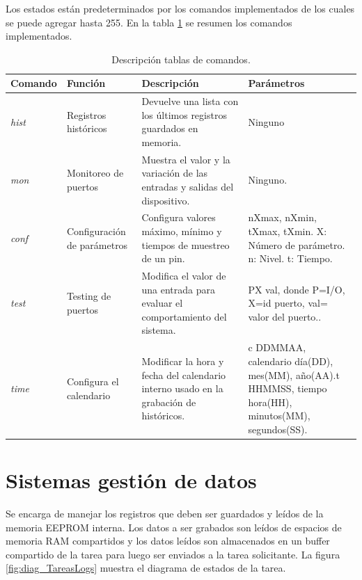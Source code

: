 Los estados están predeterminados por los comandos implementados de los cuales se puede agregar hasta 255. En la tabla \ref{tablas_comandos} se resumen los comandos implementados.

\begin{table}[]
\hspace{-1.5cm}
\begin{flushleft}
\begin{tabular}{|m{1.8cm}|m{3cm}|m{4.5cm}|m{4.5cm}|}\hline
{\textbf{Comando}} & {\textbf{Función}} & {\textbf{Descripción}} & {\textbf{Parámetros}} \\ \hline
{\textit{hist}} & {Registros históricos} & { Devuelve una lista con los últimos registros guardados en memoria.} & {Ninguno} \\ \hline
{\textit{mon}} & {Monitoreo de puertos} & {Muestra el valor y la variación de las entradas y salidas del dispositivo.} & {Ninguno.} \\ \hline
{\textit{conf}} & {Configuración de parámetros} & {Configura valores máximo, mínimo y tiempos de muestreo de un pin.} & {nXmax, nXmin, tXmax, tXmin. X: Número de parámetro. n: Nivel. t: Tiempo.} \\ \hline
{\textit{test}} & {Testing de puertos} & {Modifica el valor de una entrada para evaluar el comportamiento del sistema.} & {PX val, donde P=I/O, X=id puerto, val= valor del puerto..} \\ \hline
{\textit{time}} & {Configura el calendario} & {Modificar la hora y fecha del calendario interno usado en la grabación de históricos.} & {c DDMMAA, calendario día(DD), mes(MM), año(AA).t HHMMSS, tiempo hora(HH), minutos(MM), segundos(SS).} \\ \hline
\end{tabular}
\end{flushleft}
\caption{Descripción tablas de comandos.}
\label{tablas_comandos}
\end{table}


\section{ Sistemas gestión de datos }

Se encarga de manejar los registros que deben ser guardados y leídos de la memoria EEPROM interna. Los datos a ser grabados son leídos de espacios de memoria RAM compartidos y los datos leídos son almacenados en un buffer compartido de la tarea para luego ser enviados a la tarea solicitante.
La figura \ref{fig:diag_TareasLogs} muestra el diagrama de estados de la tarea.

